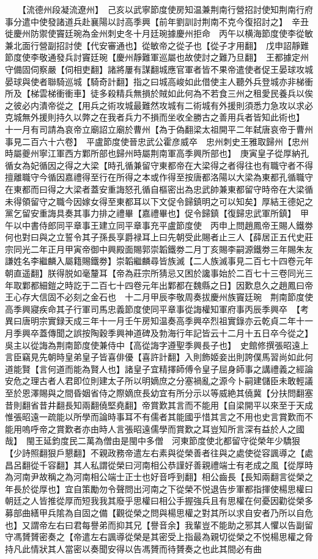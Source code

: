 　　【流德州段凝流遼州】　己亥以武寧節度使房知温兼荆南行營招討使知荆南行府事分遣中使發諸道兵赴襄陽以討高季興【前年劉訓討荆南不克今復招討之】　辛丑徙慶州防禦使竇廷琬為金州刺史冬十月廷琬據慶州拒命　丙午以横海節度使李從敏兼北面行營副招討使【代安審通也】從敏帝之從子也【從子才用翻】　戊申詔靜難節度使李敬通發兵討竇廷琬【慶州靜難軍巡屬也故使討之難乃旦翻】　王都據定州守備固伺察嚴【伺相吏翻】諸將屢有謀翻城應官軍者皆不果帝遣使者促王晏球攻城晏球與使者聯騎巡城【騎奇計翻】指之曰城高峻如此借使主人聽外兵登城亦非梯衝所及【梯雲梯衝衝車】徒多殺精兵無損於賊如此何為不若食三州之租愛民養兵以俟之彼必内潰帝從之【用兵之術攻城最難然攻城有二術城有外援則須悉力急攻以求必克城無外援則持久以弊之在我者兵力不損而坐收全勝古之善用兵者皆知此術也】　十一月有司請為哀帝立廟詔立廟於曹州【為于偽翻梁太祖開平二年弑唐哀帝于曹州事見二百六十六卷】　平盧節度使晉忠武公霍彦威卒　忠州刺史王雅取歸州【忠州時屬夔州寧江軍西方鄴所部也歸州時屬荆南軍高季興所部也】　庚寅皇子從厚納孔循女為妃循因之得之大梁【時孔循兼留守東都帝在大梁得之者得往也有職守者不得擅離職守今循因嘉禮得至行在所得之本或作得至按唐都洛陽以大梁為東都孔循職守在東都而曰得之大梁者蓋安重誨怒孔循自樞密出為忠武帥兼東都留守時帝在大梁循未得領留守之職今因嫁女得至東都耳以下文促令歸鎮明之可以知矣】厚結王德妃之黨乞留安重誨具奏其事力排之禮畢【嘉禮畢也】促令歸鎮【復歸忠武軍所鎮】　甲午以中書侍郎同平章事王建立同平章事充平盧節度使　丙申上問趙鳳帝王賜人鐵劵何也對曰與之立誓令其子孫長享爵禄耳上曰先朝受此賜者止三人【薛居正五代史莊宗同光二年正月甲寅帝御中興殿面賜郭崇韜鐵劵二月丁亥賜李嗣源鐵劵三年賜朱友謙姓名李繼麟入屬籍賜鐵劵】崇韜繼麟尋皆族滅【二人族滅事見二百七十四卷元年朝直遥翻】朕得脱如毫釐耳【帝為莊宗所猜忌又困於讒事始於二百七十三卷同光三年取鄴都細鎧之時訖于二百七十四卷元年出鄴都在魏縣之日】因歎息久之趙鳳曰帝王心存大信固不必刻之金石也　十二月甲辰李敬周奏拔慶州族竇廷琬　荆南節度使高季興寢疾命其子行軍司馬忠義節度使同平章事從誨權知軍府事丙辰季興卒　【考異曰唐明宗實録天成三年十一月壬午房知温奏高季興卒烈祖實錄亦云乾貞二年十一月季興卒蓋傳聞之誤按陶穀季興神道碑及勃海行年記皆云十二月十五日卒今從之】吳主以從誨為荆南節度使兼侍中【高從誨字遵聖季興長子也】　史館修撰張昭遠上言臣竊見先朝時皇弟皇子皆喜俳優【喜許計翻】入則飾姬妾出則誇僕馬習尚如此何道能賢【言何道而能為賢人也】諸皇子宜精擇師傅令皇子屈身師事之講禮義之經論安危之理古者人君即位則建太子所以明嫡庶之分塞禍亂之源今卜嗣建儲臣未敢輕議至於恩澤賜與之間昏姻省侍之際嫡庶長幼宜有所分示以等威絶其僥冀【分扶問翻塞昔則翻省昔井翻長知兩翻僥堅堯翻】帝賞歎其言而不能用【自梁開平以來至于天成惟張昭遠一疏能以所學而論時事耳不有儒者其能國乎惜其言之不用也史言賞歎而不能用嗚呼帝之賞歎者亦由時人言張昭遠儒學而賞歎之耳豈知所言深有益於人之國哉】　閩王延鈞度民二萬為僧由是閩中多僧　河東節度使北都留守從榮年少驕狠【少詩照翻狠戶懇翻】不親政務帝遣左右素與從榮善者往與之處使從容諷導之【處昌呂翻從千容翻】其人私謂從榮曰河南相公恭謹好善親禮端士有老成之風【從厚時為河南尹故稱之為河南相公端士正士也好音呼到翻】相公齒長【長知兩翻言從榮之年長於從厚也】宜自策勵勿令聲問出河南之下從榮不悦退告步軍都指揮使楊思權曰朝廷之人皆推從厚而短我我其廢乎思權曰相公手握強兵且有思權在何憂因勸從榮多募部曲繕甲兵隂為自固之備【觀從榮之問與楊思權之對其所以求自安者乃所以自危也】又謂帝左右曰君每譽弟而抑其兄【譽音余】我輩豈不能助之邪其人懼以告副留守馮贇贇密奏之【帝遣左右諷導從榮是其密受上指最為親切從榮之不悦楊思權之脅持凡此情狀其人當密以奏聞安得以告馮贇而待贇奏之也此其間必有曲